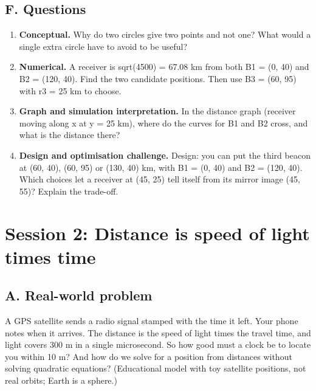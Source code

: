 \documentclass[11pt,a4paper]{article}
\begin{document}
\subsection*{F. Questions}
\begin{enumerate}[nosep]
\item \textbf{Conceptual.} Why do two circles give two points and not one? What would a single extra circle have to avoid to be useful?
\item \textbf{Numerical.} A receiver is sqrt(4500) = 67.08 km from both B1 = (0, 40) and B2 = (120, 40). Find the two candidate positions. Then use B3 = (60, 95) with r3 = 25 km to choose.
\item \textbf{Graph and simulation interpretation.} In the distance graph (receiver moving along x at y = 25 km), where do the curves for B1 and B2 cross, and what is the distance there?
\item \textbf{Design and optimisation challenge.} Design: you can put the third beacon at (60, 40), (60, 95) or (130, 40) km, with B1 = (0, 40) and B2 = (120, 40). Which choices let a receiver at (45, 25) tell itself from its mirror image (45, 55)? Explain the trade-off.
\end{enumerate}

\section{Session 2: Distance is speed of light times time}

\subsection*{A. Real-world problem}
A GPS satellite sends a radio signal stamped with the time it left. Your phone notes when it arrives. The distance is the speed of light times the travel time, and light covers 300 m in a single microsecond. So how good must a clock be to locate you within 10 m? And how do we solve for a position from distances without solving quadratic equations? (Educational model with toy satellite positions, not real orbits; Earth is a sphere.)
\end{document}
